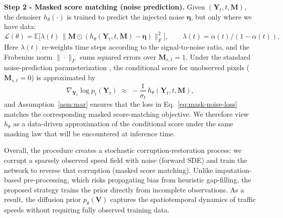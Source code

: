 \documentclass[a4paper,fleqn]{cas-sc}
\numberwithin{equation}{section}
\begin{document}
\noindent\textbf{Step 2 - Masked score matching (noise prediction).}
Given $(\mathbf Y_t,t,\mathbf M)$, the denoiser $h_\theta(\cdot)$ is trained to predict the injected noise $\boldsymbol\eta$, but only where we have data:
\begin{equation}
        \mathcal L(\theta)=\mathbb E\!\bigl[\lambda(t)\,\|\mathbf M\odot(h_\theta(\mathbf Y_t,t,\mathbf M)-\boldsymbol\eta)\|_F^{2}\bigr],\qquad
        \lambda(t)=\alpha(t)/(1-\alpha(t)).
        \label{eq:mask-noise-loss}
\end{equation}
Here \(\lambda(t)\) re-weights time steps according to the signal-to-noise ratio, and the Frobenius norm \(\|\cdot\|_F\) sums squared errors over \(\mathbf M_{s,t}=1\).
Under the standard noise-prediction parameterization \citep{daras2023ambient}, the conditional score for unobserved pixels ($\mathbf M_{s,t}=0$) is approximated by
\begin{equation}
    \nabla_{\mathbf Y_t}\!\log p_t(\mathbf Y_t)
    \;\approx\;
    -\frac{1}{\sigma_t}\,h_\theta(\mathbf Y_t,t,\mathbf M),
    \label{eq:score-approx}
\end{equation}
and Assumption~\ref{asm:mar} ensures that the loss in Eq.~\eqref{eq:mask-noise-loss} matches the corresponding masked score-matching objective. We therefore view $h_\theta$ as a data-driven approximation of the conditional score under the same masking law that will be encountered at inference time.

Overall, the procedure creates a stochastic corruption-restoration process: we corrupt a sparsely observed speed field with noise (forward SDE) and train the network to reverse that corruption (masked score matching). Unlike imputation-based pre-processing, which risks propagating bias from heuristic gap-filling, the proposed strategy trains the prior directly from incomplete observations. 
As a result, the diffusion prior $p_\theta(\mathbf V)$ captures the spatiotemporal dynamics of traffic speeds without requiring fully observed training data.

\end{document}
